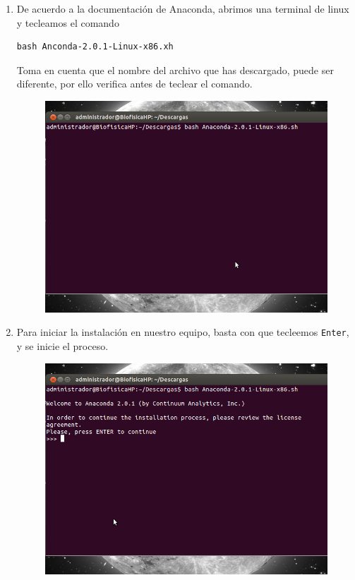 \documentclass[12pt]{article}
\begin{document}
\begin{enumerate}
\begin{figure}[H]
\end{figure}
\item De acuerdo a la documentación de Anaconda, abrimos una terminal de linux y tecleamos el comando
\\
\begin{verbatim}
bash Anconda-2.0.1-Linux-x86.xh
\end{verbatim}
Toma en cuenta que el nombre del archivo que has descargado, puede ser diferente, por ello verifica antes de teclear el comando.
\begin{figure}[H]
	\centering
	\includegraphics[scale=0.5]{Imagenes/Anaconda_Linux_03.png} 
\end{figure}
\item Para iniciar la instalación en nuestro equipo, basta con que tecleemos \texttt{Enter}, y se inicie el proceso.
\begin{figure}[H]
	\centering
	\includegraphics[scale=0.5]{Imagenes/Anaconda_Linux_04.png} 

\end{figure}
\end{enumerate}
\end{document}

